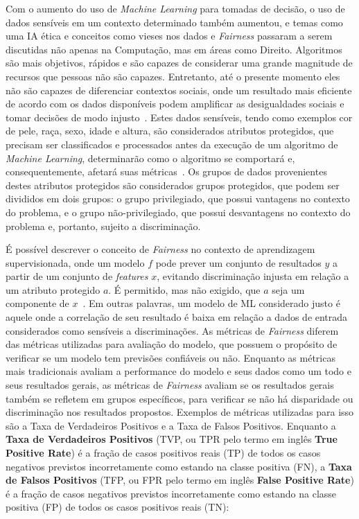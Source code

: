 \documentclass[twocolumn]{article}
\begin{document}
Com o aumento do uso de \textit{Machine Learning} para tomadas de decisão, o uso de dados sensíveis em um contexto determinado também aumentou, e temas como uma IA ética e conceitos como vieses nos dados e \textit{Fairness} passaram a serem discutidas não apenas na Computação, mas em áreas como Direito. Algoritmos são mais objetivos, rápidos e são capazes de considerar uma grande magnitude de recursos que pessoas não são capazes. Entretanto, até o presente momento eles não são capazes de diferenciar contextos sociais, onde um resultado mais eficiente de acordo com os dados disponíveis podem amplificar as desigualdades sociais e tomar decisões de modo injusto~\citep{Mehrabi_2021}. Estes dados sensíveis, tendo como exemplos cor de pele, raça, sexo, idade e altura, são considerados atributos protegidos, que precisam ser classificados e processados antes da execução de um algoritmo de \textit{Machine Learning}, determinarão como o algoritmo se comportará e, consequentemente, afetará suas métricas~\citep{Mougan_2022}. Os grupos de dados provenientes destes atributos protegidos são considerados grupos protegidos, que podem ser divididos em dois grupos: o grupo privilegiado, que possui vantagens no contexto do problema, e o grupo não-privilegiado, que possui desvantagens no contexto do problema e, portanto, sujeito a discriminação.

É possível descrever o conceito de \textit{Fairness} no contexto de aprendizagem supervisionada, onde um modelo $f$ pode prever um conjunto de resultados $y$ a partir de um conjunto de \textit{features} $x$, evitando discriminação injusta em relação a um atributo protegido $a$. É permitido, mas não exigido, que $a$ seja um componente de $x$~\citep{Begley_2021}. Em outras palavras, um modelo de ML considerado justo é aquele onde a correlação de seu resultado é baixa em relação a dados de entrada considerados como sensíveis a discriminações. As métricas de \textit{Fairness} diferem das métricas utilizadas para avaliação do modelo, que possuem o propósito de verificar se um modelo tem previsões confiáveis ou não. Enquanto as métricas mais tradicionais avaliam a performance do modelo e seus dados como um todo e seus resultados gerais, as métricas de \textit{Fairness} avaliam se os resultados gerais também se refletem em grupos específicos, para verificar se não há disparidade ou discriminação nos resultados propostos. Exemplos de métricas utilizadas para isso são a Taxa de Verdadeiros Positivos e a Taxa de Falsos Positivos. Enquanto a \textbf{Taxa de Verdadeiros Positivos} (TVP, ou TPR pelo termo em inglês \textbf{True Positive Rate}) é a fração de casos positivos reais (TP) de todos os casos negativos previstos incorretamente como estando na classe positiva (FN), a \textbf{Taxa de Falsos Positivos} (TFP, ou FPR pelo termo em inglês \textbf{False Positive Rate}) é a fração de casos negativos previstos incorretamente como estando na classe positiva (FP) de todos os casos positivos reais (TN):
\end{document}
